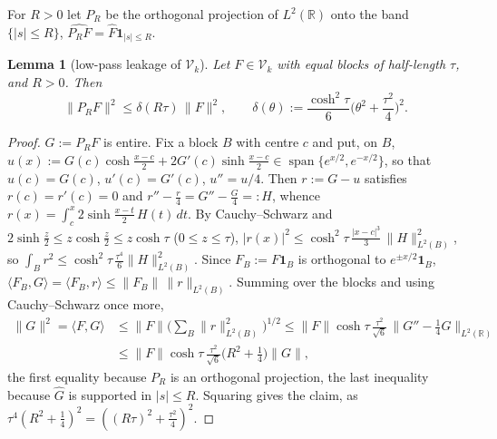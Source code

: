 \documentclass[11pt]{amsart}
\newtheorem{lemma}[theorem]{Lemma}
\theoremstyle{definition}
\theoremstyle{remark}
\newcommand{\R}{\mathbb R}
\newcommand{\Fh}{\widehat F}
\begin{document}
For $R>0$ let $P_R$ be the orthogonal projection of $L^2(\R)$ onto the band $\{|s|\le R\}$,
$\widehat{P_RF}=\Fh\mathbf 1_{|s|\le R}$.

\begin{lemma}[low-pass leakage of $\mathcal V_k$]\label{lem:coer-lowpass}
Let $F\in\mathcal V_k$ with equal blocks of half-length $\tau$, and $R>0$. Then
\[
\|P_RF\|^2\le\delta(R\tau)\,\|F\|^2,\qquad \delta(\theta):=\frac{\cosh^2\tau}{6}\Big(\theta^2+\frac{\tau^2}4\Big)^2 .
\]
\end{lemma}
\begin{proof}
$G:=P_RF$ is entire. Fix a block $B$ with centre $c$ and put, on $B$,
$u(x):=G(c)\cosh\frac{x-c}2+2G'(c)\sinh\frac{x-c}2\in\operatorname{span}\{e^{x/2},e^{-x/2}\}$, so that
$u(c)=G(c)$, $u'(c)=G'(c)$, $u''=u/4$. Then $r:=G-u$ satisfies $r(c)=r'(c)=0$ and
$r''-\frac r4=G''-\frac G4=:H$, whence $r(x)=\int_c^x2\sinh\frac{x-t}2\,H(t)\,dt$. By Cauchy--Schwarz and
$2\sinh\frac z2\le z\cosh\frac z2\le z\cosh\tau$ ($0\le z\le\tau$),
$|r(x)|^2\le\cosh^2\tau\,\frac{|x-c|^3}3\,\|H\|_{L^2(B)}^2$, so $\int_Br^2\le\cosh^2\tau\,\frac{\tau^4}6\|H\|_{L^2(B)}^2$.
Since $F_B:=F\mathbf 1_B$ is orthogonal to $e^{\pm x/2}\mathbf 1_B$, $\langle F_B,G\rangle=\langle F_B,r\rangle\le\|F_B\|\,\|r\|_{L^2(B)}$.
Summing over the blocks and using Cauchy--Schwarz once more,
\begin{align*}
\|G\|^2=\langle F,G\rangle&\le\|F\|\Big(\sum_B\|r\|_{L^2(B)}^2\Big)^{1/2}\le\|F\|\cosh\tau\,\frac{\tau^2}{\sqrt6}\,\|G''-\tfrac14G\|_{L^2(\R)}\\
&\le\|F\|\cosh\tau\,\frac{\tau^2}{\sqrt6}\Big(R^2+\frac14\Big)\|G\|,
\end{align*}
the first equality because $P_R$ is an orthogonal projection, the last inequality because
$\widehat G$ is supported in $|s|\le R$. Squaring gives the claim, as $\tau^4(R^2+\frac14)^2=((R\tau)^2+\frac{\tau^2}4)^2$.
\end{proof}
\end{document}

